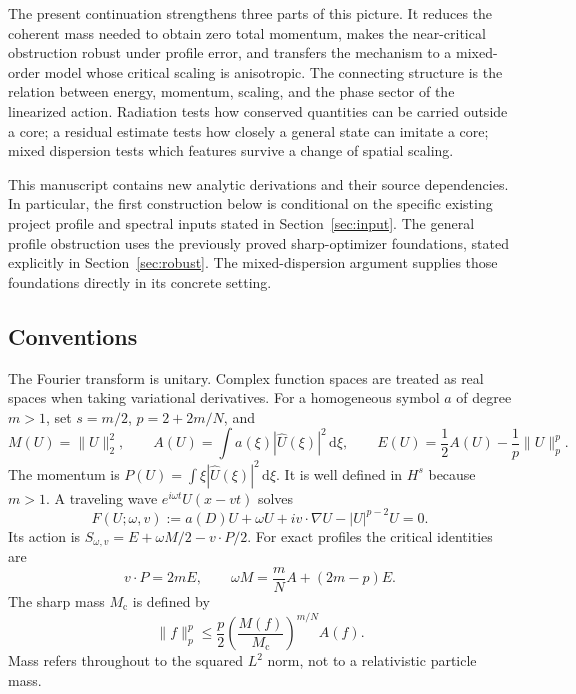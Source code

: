 \documentclass[11pt]{article}
\theoremstyle{definition}
\theoremstyle{remark}
\newcommand{\norm}[1]{\lVert #1\rVert}
\newcommand{\mc}{M_{\mathrm c}}
\newcommand{\dd}{\,\mathrm d}
\begin{document}
The present continuation strengthens three parts of this picture. It reduces the coherent mass needed to obtain zero total momentum, makes the near-critical obstruction robust under profile error, and transfers the mechanism to a mixed-order model whose critical scaling is anisotropic. The connecting structure is the relation between energy, momentum, scaling, and the phase sector of the linearized action. Radiation tests how conserved quantities can be carried outside a core; a residual estimate tests how closely a general state can imitate a core; mixed dispersion tests which features survive a change of spatial scaling.

This manuscript contains new analytic derivations and their source dependencies. In particular, the first construction below is conditional on the specific existing project profile and spectral inputs stated in Section~\ref{sec:input}. The general profile obstruction uses the previously proved sharp-optimizer foundations, stated explicitly in Section~\ref{sec:robust}. The mixed-dispersion argument supplies those foundations directly in its concrete setting.

\subsection{Conventions}

The Fourier transform is unitary. Complex function spaces are treated as real spaces when taking variational derivatives. For a homogeneous symbol $a$ of degree $m>1$, set $s=m/2$, $p=2+2m/N$, and
\begin{equation}\label{eq:generalcharges}
 M(U)=\norm{U}_2^2,\qquad
 A(U)=\int a(\xi)|\widehat U(\xi)|^2\dd\xi,\qquad
 E(U)=\frac12A(U)-\frac1p\norm{U}_p^p.
\end{equation}
The momentum is $P(U)=\int\xi|\widehat U(\xi)|^2\dd\xi$. It is well defined in $H^s$ because $m>1$. A traveling wave $e^{i\omega t}U(x-vt)$ solves
\begin{equation}\label{eq:generalprofile}
 F(U;\omega,v):=a(D)U+\omega U+iv\cdot\nabla U-|U|^{p-2}U=0.
\end{equation}
Its action is $S_{\omega,v}=E+\omega M/2-v\cdot P/2$. For exact profiles the critical identities are
\begin{equation}\label{eq:generalpohozaev}
 v\cdot P=2mE,\qquad
 \omega M=\frac mN A+(2m-p)E.
\end{equation}
The sharp mass $\mc$ is defined by
\begin{equation}\label{eq:sharpGN}
 \norm{f}_p^p\le\frac p2\left(\frac{M(f)}{\mc}\right)^{m/N}A(f).
\end{equation}
Mass refers throughout to the squared $L^2$ norm, not to a relativistic particle mass.
\end{document}
